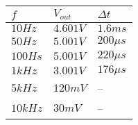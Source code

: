 \begin{tabular}{| m{5em} | m{5em} | m{5em} |}
    \hline
    $f$ & $V_{out}$ & $\Delta t$\\ 
    \hline
    $10Hz$ & $4.601V$ & $1.6ms$\\
    $50Hz$ & $5.001V$ & $200\mu s$\\
    $100Hs$ & $5.001V$ & $220\mu s$\\
    $1kHz$ & $3.001V$ & $176\mu s$\\
    $5kHz$ & $120mV$ & --\\
    $10kHz$ & $30mV$ & --\\
    \hline
\end{tabular}